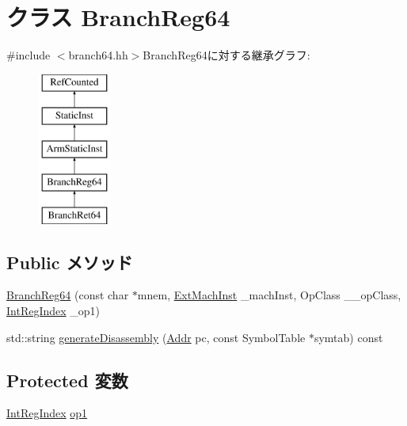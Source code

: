 \hypertarget{classArmISA_1_1BranchReg64}{
\section{クラス BranchReg64}
\label{classArmISA_1_1BranchReg64}
}


{\ttfamily \#include $<$branch64.hh$>$}BranchReg64に対する継承グラフ:\begin{figure}[H]
\begin{center}
\leavevmode
\includegraphics[height=5cm]{classArmISA_1_1BranchReg64}
\end{center}
\end{figure}
\subsection*{Public メソッド}
\begin{DoxyCompactItemize}
\item 
\hyperlink{classArmISA_1_1BranchReg64_a82752dfaa681072da7204137444208b8}{BranchReg64} (const char $\ast$mnem, \hyperlink{classStaticInst_a5605d4fc727eae9e595325c90c0ec108}{ExtMachInst} \_\-machInst, OpClass \_\-\_\-opClass, \hyperlink{namespaceArmISA_ae64680ba9fb526106829d6bf92fc791b}{IntRegIndex} \_\-op1)
\item 
std::string \hyperlink{classArmISA_1_1BranchReg64_a95d323a22a5f07e14d6b4c9385a91896}{generateDisassembly} (\hyperlink{classm5_1_1params_1_1Addr}{Addr} pc, const SymbolTable $\ast$symtab) const 
\end{DoxyCompactItemize}
\subsection*{Protected 変数}
\begin{DoxyCompactItemize}
\item 
\hyperlink{namespaceArmISA_ae64680ba9fb526106829d6bf92fc791b}{IntRegIndex} \hyperlink{classArmISA_1_1BranchReg64_a4c465c43ad568f8bcf8ae71480e9cfea}{op1}
\end{DoxyCompactItemize}


